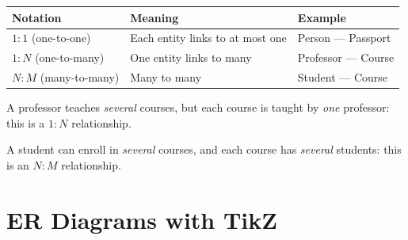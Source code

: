 \begin{keyformulas}[title=\textbf{Cardinality Types}]
\begin{center}
\begin{tabular}{lll}
\toprule
\textbf{Notation} & \textbf{Meaning} & \textbf{Example} \\
\midrule
$1:1$ (one-to-one) & Each entity links to at most one & Person --- Passport \\
$1:N$ (one-to-many) & One entity links to many & Professor --- Course \\
$N:M$ (many-to-many) & Many to many & Student --- Course \\
\bottomrule
\end{tabular}
\end{center}
\end{keyformulas}

\begin{example}
A professor teaches \emph{several} courses, but each course is taught by
\emph{one} professor: this is a $1:N$ relationship.

A student can enroll in \emph{several} courses, and each course has
\emph{several} students: this is an $N:M$ relationship.
\end{example}

\section{ER Diagrams with TikZ}

